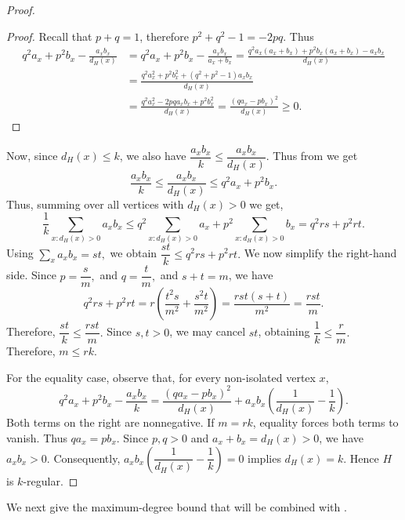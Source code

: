 \documentclass[11pt,a4paper]{article}
\newtheorem{lemma}[theorem]{Lemma}
\newtheorem{claim}[theorem]{Claim}
\theoremstyle{definition}
\theoremstyle{remark}
\begin{document}
\begin{proof}
   \begin{proof} Recall that $p+q =1$, therefore $p^2+q^2 -1 = -2pq$. Thus
\begin{align*}
q^2a_x+p^2b_x-\frac{a_xb_x}{d_H(x)}
&=
q^2a_x+p^2b_x-\frac{a_xb_x}{a_x+b_x}
=
\frac{
q^2a_x(a_x+b_x)
+
p^2b_x(a_x+b_x)
-
a_xb_x
}{d_H(x)}\\
&=
\frac{
q^2a_x^2+p^2b_x^2+
(q^2+p^2-1)a_xb_x
}{d_H(x)}\\
&=
\frac{q^2a_x^2-2pqa_xb_x+p^2b_x^2}{d_H(x)}
=
\frac{(qa_x-pb_x)^2}{d_H(x)}
\geq 0.
\end{align*}\end{proof}
Now, since $d_H(x)\leq k$, we also have
    $\dfrac{a_xb_x}{k}
    \leq
    \dfrac{a_xb_x}{d_H(x)}.$
Thus from  we get
$$
    \frac{a_xb_x}{k}
    \leq
    \frac{a_xb_x}{d_H(x)}
    \leq
    q^2a_x+p^2b_x.
$$
Thus, summing over all vertices with $d_H(x)>0$ we get,
$$
\frac{1}{k}\sum_{x:d_H(x)>0}a_xb_x
\leq
q^2\sum_{x:d_H(x)>0}a_x
+
p^2\sum_{x:d_H(x)>0}b_x=
q^2rs+p^2rt.
$$
Using $\sum_xa_xb_x=st,$ we obtain
    $\dfrac{st}{k}
    \leq
    q^2rs+p^2rt.$
We now simplify the right-hand side. Since
    $p=\dfrac{s}{m},$ and $q=\dfrac{t}{m},$
and $s+t=m$, we have
$$
q^2rs+p^2rt
=
r\left(
\frac{t^2s}{m^2}
+
\frac{s^2t}{m^2}
\right)=
\frac{rst(s+t)}{m^2}=
\frac{rst}{m}.
$$
Therefore, $\dfrac{st}{k}\leq\dfrac{rst}{m}.$
Since $s,t>0$, we may cancel $st$, obtaining
$\dfrac{1}{k}\leq\dfrac{r}{m}.$ Therefore,
    $m\leq rk.$
    
\vspace{2mm} 

For the equality case, observe that, for every non-isolated vertex $x$,
$$
q^{2}a_x+p^{2}b_x-\frac{a_xb_x}{k}
=
\frac{(qa_x-pb_x)^{2}}{d_H(x)}
+a_xb_x\left(\frac{1}{d_H(x)}-\frac{1}{k}\right).
$$
Both terms on the right are nonnegative. If $m=rk$, equality forces both
terms to vanish. Thus $qa_x=pb_x$. Since $p,q>0$ and
$a_x+b_x=d_H(x)>0$, we have $a_xb_x>0$. Consequently,
$a_xb_x\left(\dfrac{1}{d_H(x)}-\dfrac{1}{k}\right)=0$ implies $d_H(x)=k$. Hence $H$ is $k$-regular.
\end{proof}

We next give the maximum-degree bound that will be combined with
.

\end{document}
